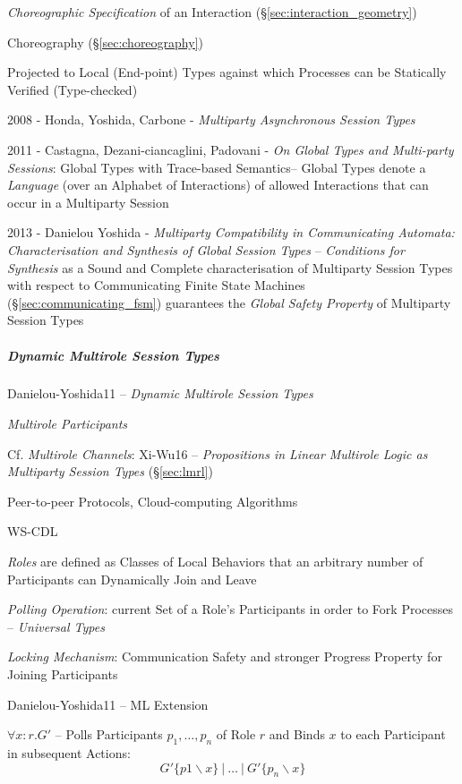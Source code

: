 \emph{Choreographic Specification} of an Interaction
(\S\ref{sec:interaction_geometry})

\fist Choreography (\S\ref{sec:choreography})

Projected to Local (End-point) Types against which Processes can be
Statically Verified (Type-checked)

2008 - Honda, Yoshida, Carbone - \emph{Multiparty Asynchronous Session
  Types} \cite{honda-yoshida-carbone08}

2011 - Castagna, Dezani-ciancaglini, Padovani - \emph{On Global Types
  and Multi-party Sessions}: Global Types with Trace-based Semantics--
Global Types denote a \emph{Language} (over an Alphabet of
Interactions) of allowed Interactions that can occur in a Multiparty
Session

2013 - Danielou Yoshida - \emph{Multiparty Compatibility in
  Communicating Automata: Characterisation and Synthesis of Global
  Session Types} -- \emph{Conditions for Synthesis} as a Sound and
Complete characterisation of Multiparty Session Types with respect to
Communicating Finite State Machines (\S\ref{sec:communicating_fsm})
guarantees the \emph{Global Safety Property} of Multiparty Session
Types



\subparagraph{Dynamic Multirole Session Types}
\label{sec:multirole_session}\hfill

Danielou-Yoshida11 -- \emph{Dynamic Multirole Session Types}

\emph{Multirole Participants}

\fist Cf. \emph{Multirole Channels}: Xi-Wu16 -- \emph{Propositions in
  Linear Multirole Logic as Multiparty Session Types}
(\S\ref{sec:lmrl})

Peer-to-peer Protocols, Cloud-computing Algorithms

WS-CDL

\emph{Roles} are defined as Classes of Local Behaviors that an
arbitrary number of Participants can Dynamically Join and Leave

\emph{Polling Operation}: current Set of a Role's Participants in
order to Fork Processes -- \emph{Universal Types}

\emph{Locking Mechanism}: Communication Safety and stronger Progress
Property for Joining Participants

Danielou-Yoshida11 -- ML Extension

$\forall x : r.G'$ -- Polls Participants $p_1, \ldots, p_n$ of Role
$r$ and Binds $x$ to each Participant in subsequent Actions:
\[
  G' \{ p1 \backslash x \} \ |\ \ldots \ |\ G' \{ p_n \backslash x \}
\]

